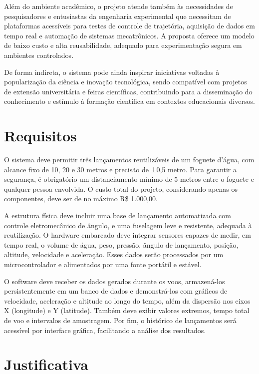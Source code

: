 Além do ambiente acadêmico, o projeto atende também às necessidades de pesquisadores e entusiastas da engenharia experimental que necessitam de plataformas acessíveis para testes de controle de trajetória, aquisição de dados em tempo real e automação de sistemas mecatrônicos. A proposta oferece um modelo de baixo custo e alta reusabilidade, adequado para experimentação segura em ambientes controlados.

De forma indireta, o sistema pode ainda inspirar iniciativas voltadas à popularização da ciência e inovação tecnológica, sendo compatível com projetos de extensão universitária e feiras científicas, contribuindo para a disseminação do conhecimento e estímulo à formação científica em contextos educacionais diversos.

\section{Requisitos}

O sistema deve permitir três lançamentos reutilizáveis de um foguete d’água, com alcance fixo de 10, 20 e 30 metros e precisão de ±0,5 metro. Para garantir a segurança, é obrigatório um distanciamento mínimo de 5 metros entre o foguete e qualquer pessoa envolvida. O custo total do projeto, considerando apenas os componentes, deve ser de no máximo R\$ 1.000{,}00.

A estrutura física deve incluir uma base de lançamento automatizada com controle eletromecânico de ângulo, e uma fuselagem leve e resistente, adequada à reutilização. O hardware embarcado deve integrar sensores capazes de medir, em tempo real, o volume de água, peso, pressão, ângulo de lançamento, posição, altitude, velocidade e aceleração. Esses dados serão processados por um microcontrolador e alimentados por uma fonte portátil e estável.

O software deve receber os dados gerados durante os voos, armazená-los persistentemente em um banco de dados e demonstrá-los com gráficos de velocidade, aceleração e altitude ao longo do tempo, além da dispersão nos eixos X (longitude) e Y (latitude). Também deve exibir valores extremos, tempo total de voo e intervalos de amostragem. Por fim, o histórico de lançamentos será acessível por interface gráfica, facilitando a análise dos resultados.

\section{Justificativa}


